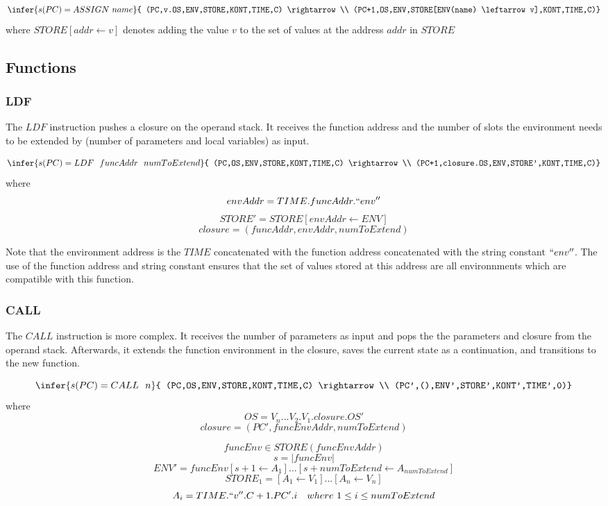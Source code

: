 \documentclass[12pt]{article}
\begin{document}
$$\infer{s(PC) = ASSIGN\ name}{
  (PC,v.OS,ENV,STORE,KONT,TIME,C) \rightarrow \\
  (PC+1,OS,ENV,STORE[ENV(name) \leftarrow v],KONT,TIME,C)}$$
where $STORE[addr \leftarrow v]$ denotes adding the value $v$ to the set of values at the address $addr$ in $STORE$

\subsection{Functions}
\subsubsection{LDF}
The $LDF$ instruction pushes a closure on the operand stack. It receives the function address and the number of slots the environment needs to be extended by (number of parameters and local variables) as input.

$$\infer{s(PC) = LDF\ \ funcAddr\ \ numToExtend}{
    (PC,OS,ENV,STORE,KONT,TIME,C) \rightarrow \\
    (PC+1,closure.OS,ENV,STORE',KONT,TIME,C)}$$
where
$$envAddr=TIME.funcAddr.``env''$$
$$STORE'=STORE[envAddr \leftarrow ENV]$$
$$closure=(funcAddr,envAddr,numToExtend)$$

Note that the environment address is the $TIME$ concatenated with the function address concatenated with the string constant $``env''$. The use of the function address and string constant ensures that the set of values stored at this address are all environnments which are compatible with this function.

\subsubsection{CALL}
The $CALL$ instruction is more complex. It receives the number of parameters as input and pops the the parameters and closure from the operand stack. Afterwards, it extends the function environment in the closure, saves the current state as a continuation, and transitions to the new function.

$$\infer{s(PC) = CALL\ \ n}{
    (PC,OS,ENV,STORE,KONT,TIME,C) \rightarrow \\
    (PC',(),ENV',STORE',KONT',TIME',0)}$$
where
$$OS=V_n...V_2.V_1.closure.OS'$$
$$closure=(PC',funcEnvAddr,numToExtend)$$

$$funcEnv \in STORE(funcEnvAddr)$$
$$s=|funcEnv|$$
$$ENV'=funcEnv[s+1 \leftarrow A_1]...[s+numToExtend \leftarrow A_{numToExtend}]$$
$$STORE_1=[A_1 \leftarrow V_1]...[A_n \leftarrow V_n]$$
$$A_i=TIME.``v''.C+1.PC'.i \quad where\ 1 \leq i \leq numToExtend$$
\end{document}
